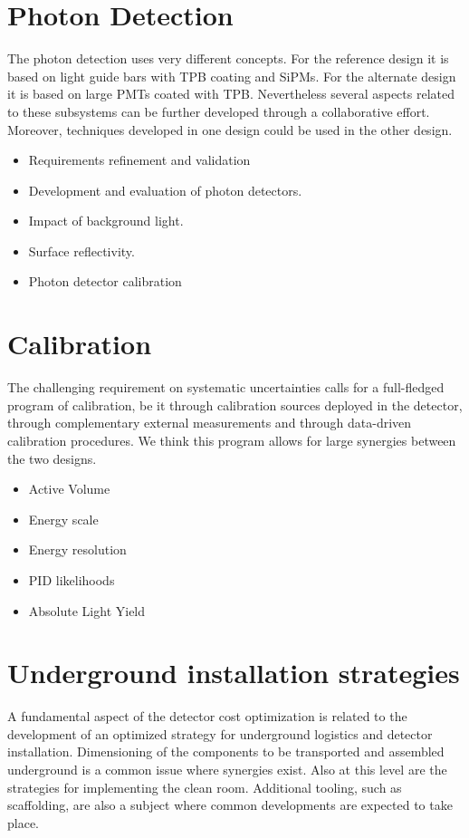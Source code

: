  
\section{Photon Detection}

The photon detection uses very different concepts. For the reference
design it is based on light guide bars with TPB coating and SiPMs.
For the alternate design it is based on large PMTs coated with
TPB. Nevertheless several aspects related to these subsystems can be
further developed through a collaborative effort.  Moreover,
techniques developed in one design could be used in the other design.
\begin{itemize}
\item Requirements refinement and validation
\item Development and evaluation of photon detectors.
\item Impact of background light.
\item  Surface reflectivity.
\item Photon detector calibration
\end{itemize}


\section{Calibration}

The challenging requirement on systematic uncertainties calls for a
full-fledged program of calibration, be it through calibration sources
deployed in the detector, through complementary external measurements
and through data-driven calibration procedures. We think this program
allows for large synergies between the two designs.
\begin{itemize}
\item Active Volume
\item Energy scale
\item Energy resolution
\item PID likelihoods
\item Absolute Light Yield	
\end{itemize}


\section{Underground installation strategies}
A fundamental aspect of the detector cost optimization is related to
the development of an optimized strategy for underground logistics and
detector installation. Dimensioning of the components to be
transported and assembled underground is a common issue where
synergies exist. Also at this level are the strategies for
implementing the clean room. Additional tooling, such as scaffolding,
are also a subject where common developments are expected to take
place.

